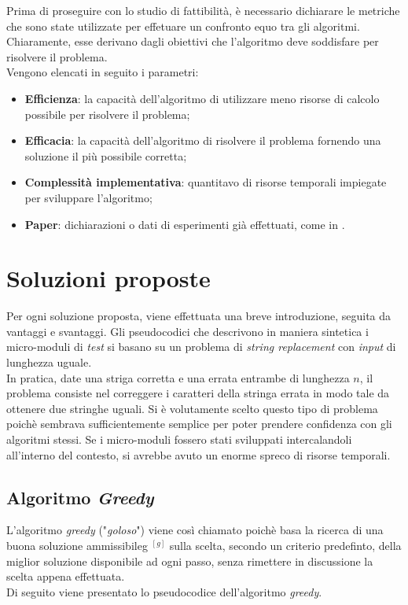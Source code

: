 \noindent Prima di proseguire con lo studio di fattibilità, è necessario dichiarare le metriche che sono state
utilizzate per effetuare un confronto equo tra gli algoritmi. Chiaramente, esse derivano dagli obiettivi che
l'algoritmo deve soddisfare per risolvere il problema.\\
Vengono elencati in seguito i parametri:
\begin{itemize}
    \item \textbf{Efficienza}: la capacità dell'algoritmo di utilizzare meno risorse di calcolo possibile per risolvere il problema;
    \item \textbf{Efficacia}: la capacità dell'algoritmo di risolvere il problema fornendo una soluzione il più possibile corretta;
    \item \textbf{Complessità implementativa}: quantitavo di risorse temporali impiegate per sviluppare l'algoritmo;
    \item \textbf{Paper}: dichiarazioni o dati di esperimenti già effettuati, come in \cite{site:paper-chen} \cite{site:paper-roli} \cite{site:paper-carlos}.
\end{itemize}


\section{Soluzioni proposte}
\noindent Per ogni soluzione proposta, viene effettuata una breve introduzione, seguita da vantaggi e svantaggi.
Gli pseudocodici che descrivono in maniera sintetica i micro-moduli di \textit{test} si basano su un problema di \textit{string replacement}
con \textit{input} di lunghezza uguale.\\
In pratica, date una striga corretta e una errata entrambe di lunghezza $n$, il problema consiste nel correggere i caratteri della stringa errata
in modo tale da ottenere due stringhe uguali.
Si è volutamente scelto questo tipo di problema poichè sembrava sufficientemente semplice per poter prendere confidenza con gli algoritmi stessi.
Se i micro-moduli fossero stati sviluppati intercalandoli all'interno del contesto, si avrebbe avuto un enorme spreco di risorse temporali.

\subsection{Algoritmo \textit{Greedy}}
\noindent L'algoritmo \textit{greedy} ("\textit{goloso}") \cite{Cormen:algoritmi} viene così chiamato poichè basa la ricerca di una buona
soluzione \gls{ammissibileg} $^{[g]}$ sulla scelta, secondo un criterio predefinto, della miglior soluzione disponibile ad ogni passo, senza
rimettere in discussione la scelta appena effettuata.\\
Di seguito viene presentato lo pseudocodice dell'algoritmo \textit{greedy}.

